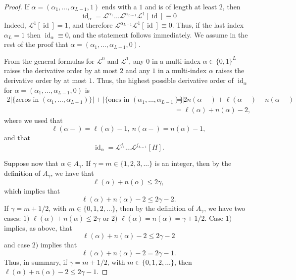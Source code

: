 \documentclass[10pt,a4paper]{amsart}
\newcommand{\LL}{\mathcal{L}}
\newcommand{\Li}{\mathcal{L}^{1}}
\newcommand{\Lo}{\mathcal{L}^{0}}
\newcommand{\id}{\operatorname{id}}
\begin{document}
\begin{proof}
If $\alpha = (\alpha_{1},\ldots,\alpha_{L-1},1)$ ends with a $1$ and is of length at least $2$, then
\begin{equation*}
\id_{\alpha} = \LL^{\alpha_{1}} \dots \LL^{\alpha_{L-1}} \Li [\id] \equiv 0
\end{equation*}
Indeed, $\Li [\id] = 1$, and therefore $\LL^{\alpha_{L-1}} \Li [\id] \equiv 0$. Thus, if the last index $\alpha_{L} = 1$ then $\id_{\alpha} \equiv 0$, and the statement follows immediately. We assume in the rest of the proof that $\alpha = (\alpha_{1},\ldots,\alpha_{L-1},0)$.

From the general formulas for $\Lo$ and $\Li$, any $0$ in a multi-index $\alpha \in \{ 0,1 \}^{L}$ raises the derivative order by at most $2$ and any $1$ in a multi-index $\alpha$ raises the derivative order by at most $1$. Thus, the highest possible derivative order of $\id_{\alpha}$ for $\alpha = (\alpha_{1},\ldots,\alpha_{L-1},0)$ is
\begin{align*}
2 \left| \{ \text{zeros in } (\alpha_{1},\ldots,\alpha_{L-1}) \} \right| + \left| \{ \text{ones in } (\alpha_{1},\ldots,\alpha_{L-1}) \} \right| &= 2 n (\alpha -) + \ell(\alpha-) - n(\alpha-) \\ &= \ell(\alpha) + n(\alpha) - 2,
\end{align*}
where we used that
\begin{equation*}
\ell(\alpha-)= \ell(\alpha)-1,\ n(\alpha-) = n(\alpha)-1,
\end{equation*}
and that
\begin{equation*}
\id_{\alpha} = \LL^{j_{1}} \ldots \LL^{j_{L-1}} [H].
\end{equation*}

Suppose now that $\alpha \in A_{\gamma}$. If $\gamma = m \in \{1,2,3,\ldots \}$ is an integer, then by the definition of $A_{\gamma}$, we have that
\begin{equation*}
\ell(\alpha) + n(\alpha) \leq 2 \gamma,
\end{equation*}
which implies that
\begin{equation*}
\ell(\alpha) + n(\alpha) - 2 \leq 2 \gamma -2.
\end{equation*}
If $\gamma = m + 1/2$, with $m \in \{0,1,2,\ldots \}$, then by the definition of $A_{\gamma}$, we have two cases: $1)$ $\ell(\alpha) + n(\alpha) \leq 2 \gamma$ or $2)$ $\ell(\alpha) = n(\alpha) = \gamma + 1/2$. Case $1)$ implies, as above, that
\begin{equation*}
\ell(\alpha) + n(\alpha) - 2 \leq 2 \gamma -2
\end{equation*}
and case $2)$ implies that
\begin{equation*}
\ell(\alpha) + n(\alpha) -2 = 2 \gamma -1.
\end{equation*}
Thus, in summary, if $\gamma = m + 1/2$, with $m \in \{ 0,1,2,\ldots \}$, then $\ell(\alpha) + n(\alpha) - 2 \leq 2 \gamma - 1$.


\end{proof}
\end{document}
